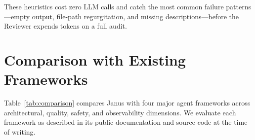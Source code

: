 \documentclass[11pt,a4paper]{article}
\begin{document}
These heuristics cost zero LLM calls and catch the most common failure
patterns---empty output, file-path regurgitation, and missing
descriptions---before the Reviewer expends tokens on a full audit.

\section{Comparison with Existing Frameworks}

Table~\ref{tab:comparison} compares Janus with four major agent frameworks
across architectural, quality, safety, and observability dimensions.
We evaluate each framework as described in its public documentation and
source code at the time of writing.
\end{document}

